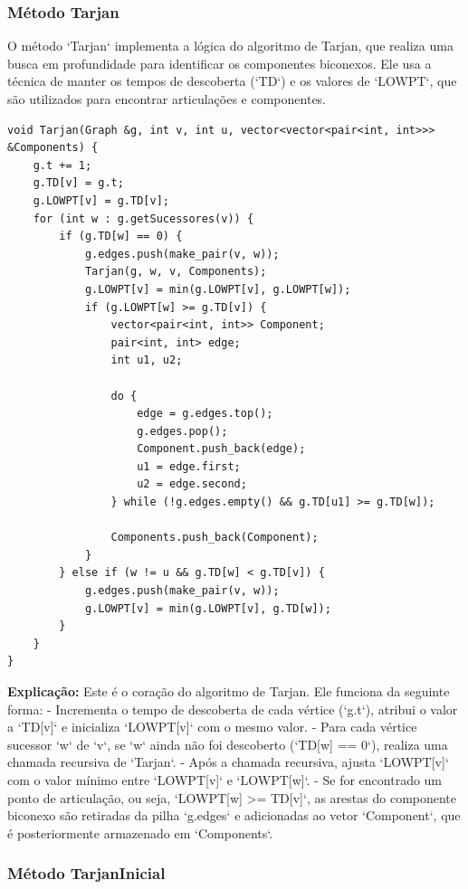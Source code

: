\documentclass[10pt,conference]{IEEEtran}
\begin{document}
\subsubsection{Método Tarjan}

O método `Tarjan` implementa a lógica do algoritmo de Tarjan, que realiza uma busca em profundidade para identificar os componentes biconexos. Ele usa a técnica de manter os tempos de descoberta (`TD`) e os valores de `LOWPT`, que são utilizados para encontrar articulações e componentes.

\begin{lstlisting}
void Tarjan(Graph &g, int v, int u, vector<vector<pair<int, int>>> &Components) {
    g.t += 1;
    g.TD[v] = g.t;
    g.LOWPT[v] = g.TD[v];
    for (int w : g.getSucessores(v)) {
        if (g.TD[w] == 0) {
            g.edges.push(make_pair(v, w));
            Tarjan(g, w, v, Components);
            g.LOWPT[v] = min(g.LOWPT[v], g.LOWPT[w]);
            if (g.LOWPT[w] >= g.TD[v]) {
                vector<pair<int, int>> Component;
                pair<int, int> edge;
                int u1, u2;

                do {
                    edge = g.edges.top();
                    g.edges.pop();
                    Component.push_back(edge);
                    u1 = edge.first;
                    u2 = edge.second;
                } while (!g.edges.empty() && g.TD[u1] >= g.TD[w]);

                Components.push_back(Component);
            }
        } else if (w != u && g.TD[w] < g.TD[v]) {
            g.edges.push(make_pair(v, w));
            g.LOWPT[v] = min(g.LOWPT[v], g.TD[w]);
        }
    }
}
\end{lstlisting}

\textbf{Explicação:} Este é o coração do algoritmo de Tarjan. Ele funciona da seguinte forma:
- Incrementa o tempo de descoberta de cada vértice (`g.t`), atribui o valor a `TD[v]` e inicializa `LOWPT[v]` com o mesmo valor.
- Para cada vértice sucessor `w` de `v`, se `w` ainda não foi descoberto (`TD[w] == 0`), realiza uma chamada recursiva de `Tarjan`.
- Após a chamada recursiva, ajusta `LOWPT[v]` com o valor mínimo entre `LOWPT[v]` e `LOWPT[w]`.
- Se for encontrado um ponto de articulação, ou seja, `LOWPT[w] >= TD[v]`, as arestas do componente biconexo são retiradas da pilha `g.edges` e adicionadas ao vetor `Component`, que é posteriormente armazenado em `Components`.

\subsubsection{Método TarjanInicial}
\end{document}
